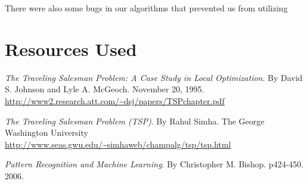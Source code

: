 \documentclass[12pt]{article}
\begin{document}
There were also some bugs in our algorithms that prevented us from utilizing 

\section*{Resources Used}

\emph{The Traveling Salesman Problem: A Case Study in Local Optimization}.  By
David S. Johnson and Lyle A. McGeoch. November 20, 1995.
\url{http://www2.research.att.com/~dsj/papers/TSPchapter.pdf}

\emph{The Traveling Salesman Problem (TSP)}.  By Rahul Simha. The George
Washington University
\url{http://www.seas.gwu.edu/~simhaweb/champalg/tsp/tsp.html}

\emph{Pattern Recognition and Machine Learning}. By Christopher M. Bishop.
p424-450. 2006.
\end{document}

